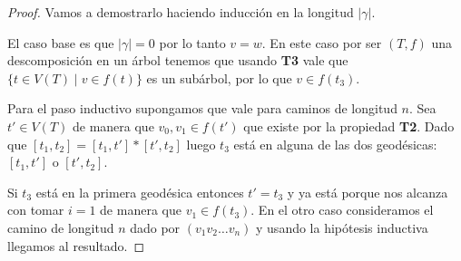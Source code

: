 \documentclass[tesis.tex]{subfiles}
\begin{document}
\begin{proof}	
	Vamos a demostrarlo haciendo inducción en la longitud $|\gamma|$.
	 
	El caso base es que $|\gamma| = 0$ por lo tanto $v=w$. 
	En este caso por ser $(T,f)$ una descomposición en un árbol tenemos que usando \textbf{T3} vale que $\{  t \in V(T) \mid v \in f(t) \}$ es un subárbol, por lo que $v \in f(t_{3})$.
	
	Para el paso inductivo supongamos que vale para caminos de longitud $n$.
	Sea $t' \in V(T)$ de manera que $v_{0}, v_{1} \in f(t')$ que existe por la propiedad \textbf{T2}.
	Dado que 
	$[t_{1}, t_{2}] = [t_{1}, t']*[t',t_{2}]$
	luego $t_{3}$ está en alguna de las dos geodésicas: $[t_{1},t']$ o $[t',t_{2}]$.
	
	Si $t_{3}$ está en la primera geodésica entonces $t' = t_{3}$ y ya está porque nos alcanza con tomar $i=1$ de manera que $v_1 \in f(t_{3})$.
	En el otro caso consideramos el camino de longitud $n$ dado por $(v_1 v_2 \dots v_n)$ y usando la hipótesis inductiva llegamos al resultado.	
\end{proof}
\end{document}
